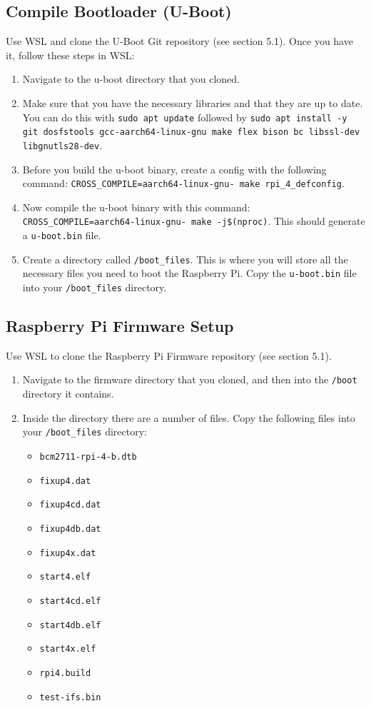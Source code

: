 \documentclass[12pt]{article}
\begin{document}
\subsection{Compile Bootloader (U-Boot)}
Use WSL and clone the U-Boot Git repository (see section 5.1). Once you have it, follow these steps in WSL:
\begin{enumerate}
    \item Navigate to the u-boot directory that you cloned.
    \item Make sure that you have the necessary libraries and that they are up to date. You can do this with \texttt{sudo apt update} followed by \texttt{sudo apt install -y git dosfstools gcc-aarch64-linux-gnu make flex bison bc libssl-dev libgnutls28-dev}.
    \item Before you build the u-boot binary, create a config with the following command: \texttt{CROSS\_COMPILE=aarch64-linux-gnu- make rpi\_4\_defconfig}.
    \item Now compile the u-boot binary with this command: \texttt{CROSS\_COMPILE=aarch64-linux-gnu- make -j\$(nproc)}. This should generate a \texttt{u-boot.bin} file.
    \item Create a directory called \texttt{/boot\_files}. This is where you will store all the necessary files you need to boot the Raspberry Pi. Copy the \texttt{u-boot.bin} file into your \texttt{/boot\_files} directory.
\end{enumerate}

\subsection{Raspberry Pi Firmware Setup}
Use WSL to clone the Raspberry Pi Firmware repository (see section 5.1).
\begin{enumerate}
    \item Navigate to the firmware directory that you cloned, and then into the \texttt{/boot} directory it contains.
    \item Inside the directory there are a number of files. Copy the following files into your \texttt{/boot\_files} directory:
    \begin{itemize}
        \item \texttt{bcm2711-rpi-4-b.dtb}
        \item \texttt{fixup4.dat}
        \item \texttt{fixup4cd.dat}
        \item \texttt{fixup4db.dat}
        \item \texttt{fixup4x.dat}
        \item \texttt{start4.elf}
        \item \texttt{start4cd.elf}
        \item \texttt{start4db.elf}
        \item \texttt{start4x.elf} 
        \item \texttt{rpi4.build}
        \item \texttt{test-ifs.bin}
    \end{itemize}
\end{enumerate}
\end{document}
